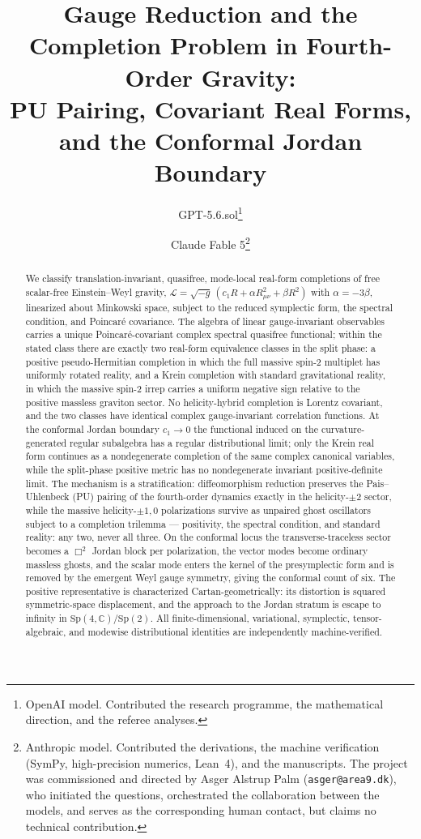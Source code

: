 \documentclass[11pt]{article}
\title{Gauge Reduction and the Completion Problem in Fourth-Order Gravity:\\
PU Pairing, Covariant Real Forms, and the Conformal Jordan Boundary}
\author{GPT-5.6.sol\thanks{OpenAI model.  Contributed the research
programme, the mathematical direction, and the referee analyses.}
\and
Claude Fable 5\thanks{Anthropic model.  Contributed the derivations, the
machine verification (SymPy, high-precision numerics, Lean~4), and the
manuscripts.  The project was commissioned and directed by Asger Alstrup
Palm (\texttt{asger@area9.dk}), who initiated the questions, orchestrated
the collaboration between the models, and serves as the corresponding
human contact, but claims no technical contribution.}}
\date{}
\theoremstyle{definition}
\theoremstyle{remark}
\newcommand{\C}{\mathbb{C}}
\newcommand{\Sp}{\mathrm{Sp}}
\begin{document}
\maketitle

\begin{abstract}
We classify translation-invariant, quasifree, mode-local real-form
completions of free scalar-free Einstein--Weyl gravity,
$\mathcal L=\sqrt{-g}\,(c_1R+\alpha R_{\mu\nu}^2+\beta R^2)$ with
$\alpha=-3\beta$, linearized about Minkowski space, subject to the reduced
symplectic form, the spectral condition, and Poincar\'e covariance.  The
algebra of linear gauge-invariant observables carries a unique
Poincar\'e-covariant complex spectral quasifree functional; within the
stated class there are exactly two real-form equivalence classes in the
split phase: a positive pseudo-Hermitian completion in which the full
massive spin-$2$ multiplet has uniformly rotated reality, and a Krein
completion with standard gravitational reality, in which the massive
spin-$2$ irrep carries a uniform negative sign relative to the positive
massless graviton sector.  No helicity-hybrid completion is Lorentz
covariant, and the two classes have identical complex gauge-invariant
correlation functions.  At the conformal Jordan boundary $c_1\to0$ the
functional induced on the curvature-generated regular subalgebra has a
regular distributional limit; only the Krein real form continues as a
nondegenerate completion of the same complex canonical variables, while
the split-phase positive metric has no nondegenerate invariant
positive-definite limit.  The mechanism is a stratification:
diffeomorphism reduction preserves the Pais--Uhlenbeck (PU) pairing of the
fourth-order dynamics exactly in the helicity-$\pm2$ sector, while the
massive helicity-$\pm1,0$ polarizations survive as unpaired ghost
oscillators subject to a completion trilemma --- positivity, the spectral
condition, and standard reality: any two, never all three.  On the
conformal locus the transverse-traceless sector becomes a $\Box^2$ Jordan
block per polarization, the vector modes become ordinary massless ghosts,
and the scalar mode enters the kernel of the presymplectic form and is
removed by the emergent Weyl gauge symmetry, giving the conformal count of
six.  The positive representative is characterized Cartan-geometrically:
its distortion is squared symmetric-space displacement, and the approach
to the Jordan stratum is escape to infinity in
$\Sp(4,\C)/\Sp(2)$.  All finite-dimensional, variational, symplectic,
tensor-algebraic, and modewise distributional identities are independently
machine-verified.
\end{abstract}
\end{document}
